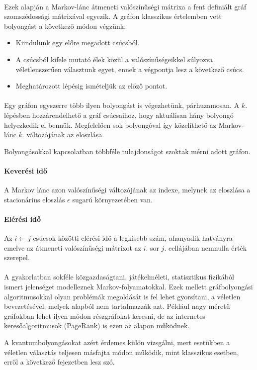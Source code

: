 \paragraph{}

Ezek alapján a Markov-lánc átmeneti valószínűségi mátrixa a fent definiált gráf
szomszédossági mátrixával egyezik. A gráfon klasszikus értelemben vett bolyongást
a következő módon végzünk:
\begin{itemize}
  \item Kiindulunk egy előre megadott csúcsból.
  \item A csúcsból kifele mutató élek közül a valószínűségeikkel súlyozva
        véletlenszerűen választunk egyet, ennek a végpontja lesz a következő csúcs.
  \item Meghatározott lépésig ismételjük az előző pontot.
\end{itemize}

\paragraph{}

Egy gráfon egyszerre több ilyen bolyongást is végezhetünk, párhuzamosan. A
$k.$ lépésben hozzárendelhető a gráf csúcsaihoz, hogy aktuálisan hány bolyongó
helyezkedik el bennük. Megfelelően sok bolyongóval így közelíthető az Markov-lánc
$k.$ változójának az eloszlása.

Bolyongásokkal kapcsolatban többféle tulajdonságot szoktak mérni adott gráfon.

\paragraph{Keverési idő} A Markov lánc azon valószínűségi változójának
az indexe, melynek az eloszlása a stacionárius eloszlás $\epsilon$ sugarú
környezetében van.

\paragraph{Elérési idő} Az $i \leftarrow j$ csúcsok
közötti elérési idő a legkisebb szám, ahanyadik hatványra emelve az
átmeneti valószínűségi mátrixot az $i.$ sor $j.$ cellájában nemnulla érték
szerepel.

\paragraph{}

A gyakorlatban sokféle közgazdaságtani, játékelméleti, statisztikus fizikából
ismert jelenséget modelleznek Markov-folyamatokkal. Ezek mellett gráfbolyongási
algoritmusokkal olyan problémák megoldását is fel lehet gyorsítani, a véletlen
bevezetésével, melyek alapból nem tartalmazzák azt. Például nagy méretű gráfokban
lehet ilyen módon részgráfokat keresni, de az internetes keresőalgoritmusok
(PageRank) is ezen az alapon működnek.

A kvantumbolyongásokat azért érdemes külön vizsgálni, mert esetükben a
véletlen választás teljesen másfajta módon működik, mint klasszikus esetben,
erről a következő fejezetben lesz szó.
